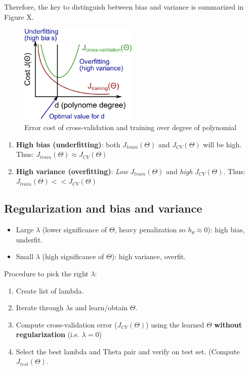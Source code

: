     Therefore, the key to distinguish between bias and variance is summarized in Figure X. 
    \begin{figure}[htbp]
        \centering
        \includegraphics[width=0.5\textwidth]{image/error-bias-variance.png}
        \caption{Error cost of cross-validation and training over degree of polynomial}
        \label{fig:error-bias-variance}
    \end{figure}

    \begin{enumerate}
        \item \textbf{High bias (underfitting)}: both $J_{train} (\Theta)$ and $J_{CV} (\Theta)$ will be high. Thus: $J_{train} (\Theta) \approx J_{CV} (\Theta)$
        \item  \textbf{High variance (overfitting)}: \emph{Low} $J_{train} (\Theta)$ and \emph{high} $J_{CV} (\Theta)$. Thus: $J_{train} (\Theta) <<  J_{CV} (\Theta)$

    \end{enumerate}

\subsection{Regularization and bias and variance}
    \begin{itemize}
        \item Large $\lambda$ (lower significance of $\Theta$, heavy penalization so $h_\theta \approx 0$): high bias, underfit. 
        \item Small $\lambda$ (high significance of $\Theta$): high variance, overfit. 
    \end{itemize}

    Procedure to pick the right $\lambda$:
    \begin{enumerate}
        \item Create list of lambda. 
        \item Iterate through $\lambda$s and learn/obtain $\Theta$. 
        \item Compute cross-validation error ($J_{CV} (\Theta) $) using the learned $\Theta$ \textbf{without regularization} (i.e. $\lambda = 0$)
        \item Select the best lambda and Theta pair and verify on test set. (Compute $J_{test} (\Theta)$.
    \end{enumerate}
